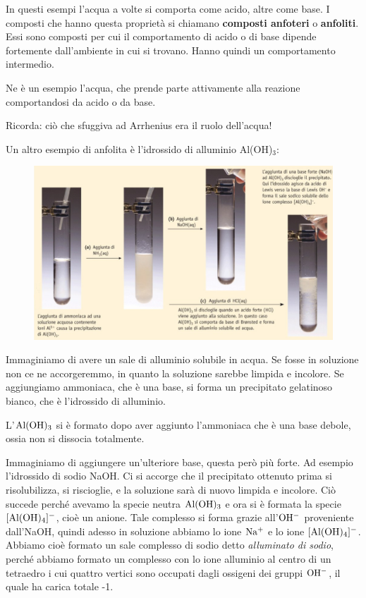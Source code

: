 \vspace{0.2cm}In questi esempi l'acqua a volte si comporta come acido, altre come base. I composti che hanno questa proprietà si chiamano \textbf{composti anfoteri} o \textbf{anfoliti}. Essi sono composti per cui il comportamento di acido o di base dipende fortemente dall'ambiente in cui si trovano. Hanno quindi un comportamento intermedio.

Ne è un esempio l'acqua, che prende parte attivamente alla reazione comportandosi da acido o da base.

\vspace{0.2cm}Ricorda: ciò che sfuggiva ad Arrhenius era il ruolo dell'acqua!

\vspace{0.2cm}Un altro esempio di anfolita è l'idrossido di alluminio Al(OH)$_3$:

\begin{figure}[htp]
    \centering
    \includegraphics[width=12cm]{immagini/anfoliti.png}
\end{figure}

Immaginiamo di avere un sale di alluminio solubile in acqua. Se fosse in soluzione non ce ne accorgeremmo, in quanto la soluzione sarebbe limpida e incolore. Se aggiungiamo ammoniaca, che è una base, si forma un precipitato gelatinoso bianco, che è l'idrossido di alluminio.

L'$\rm Al(OH)_3$ si è formato dopo aver aggiunto l'ammoniaca che è una base debole, ossia non si dissocia totalmente.

Immaginiamo di aggiungere un'ulteriore base, questa però più forte. Ad esempio l'idrossido di sodio NaOH. Ci si accorge che il precipitato ottenuto prima si risolubilizza, si riscioglie, e la soluzione sarà di nuovo limpida e incolore. Ciò succede perché avevamo la specie neutra $\rm Al(OH)_3$ e ora si è formata la specie $\rm [Al(OH)_4]^-$, cioè un anione. Tale complesso si forma grazie all'$\rm OH^-$ proveniente dall'NaOH, quindi adesso in soluzione abbiamo lo ione $\rm Na^+$ e lo ione $\rm [Al(OH)_4]^-$. Abbiamo cioè formato un sale complesso di sodio detto \textit{alluminato di sodio}, perché abbiamo formato un complesso con lo ione alluminio al centro di un tetraedro i cui quattro vertici sono occupati dagli ossigeni dei gruppi $\rm OH^-$, il quale ha carica totale -1.

